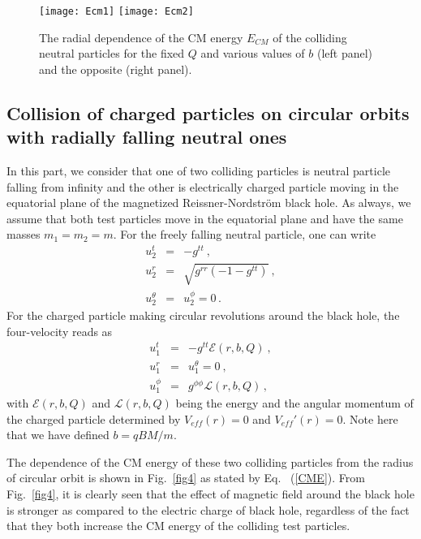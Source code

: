 \documentclass[showpacs,twocolumn,superscriptaddress]{revtex4}
\begin{document}
\begin{figure*}[t!]
	\begin{center}
		\texttt{[image: Ecm1]}
		\texttt{[image: Ecm2]}
	\end{center}
	\caption{The radial dependence of the CM energy $E_{CM}$ of the colliding neutral particles for the fixed $Q$ and various values of $b$ (left panel) and the opposite (right panel).}\label{fig3}
\end{figure*}



\subsection{ Collision of charged particles on circular orbits with radially falling neutral ones }

In this part, we consider that one of two colliding particles is neutral particle falling from infinity and the other is electrically charged particle moving in the equatorial plane of the magnetized Reissner-Nordstr\"{o}m black hole. As always, we assume that both test particles move in the equatorial plane and have the same masses $m_1=m_2=m$.  For the freely falling neutral particle, one can write
%
\begin{eqnarray}\nonumber
u_2^t&=&-g^{tt} \ ,\\
u_2^r&=&\sqrt{g^{rr} (-1-g^{tt})} \ ,\\\nonumber
u_2^\theta&=&u_2^\phi=0 \, .
\end{eqnarray}
%
For the charged particle making circular revolutions around the black hole, the four-velocity reads as
%
\begin{eqnarray}\nonumber
u_1^t&=&-g^{tt} \mathcal{E}(r,b,Q) \ ,\\
u_1^r&=&u_1^\theta=0 \ ,\\\nonumber
u_1^\phi&=&g^{\phi\phi} \mathcal{L}(r,b,Q) \, ,
\end{eqnarray}
%
with $\mathcal{E}(r,b,Q)$ and $\mathcal{L}(r,b,Q)$ being the energy and the angular momentum of the charged particle determined by $V_{eff}(r)=0$ and $V_{eff}'(r)=0$. Note here that we have defined $b=qBM/m$.

The dependence of the CM energy of these two colliding particles from the radius of circular orbit is shown in Fig.~\ref{fig4} as stated by Eq.~ (\ref{CME}). From Fig.~\ref{fig4}, it is clearly seen that the effect of magnetic field around the black hole is stronger as compared to the electric charge of black hole, regardless of the fact that they both increase the CM energy of the colliding test particles.
\\
\end{document}
